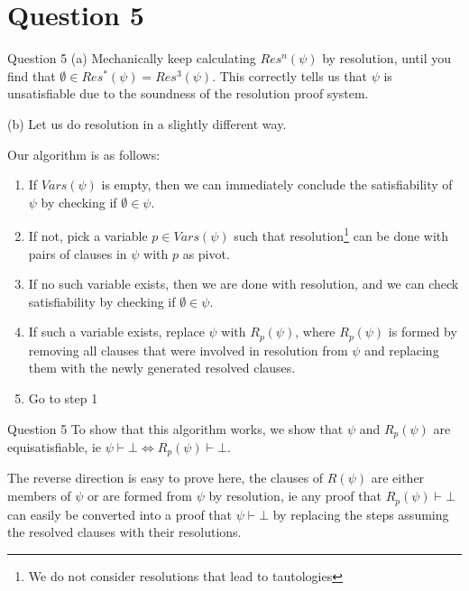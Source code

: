 \documentclass{beamer}
\begin{document}
    \section{Question 5}
    {
        \begin{frame}{Question 5}
            (a) Mechanically keep calculating $Res^{n}(\psi)$ by resolution, until you find that $\emptyset \in Res^{*}(\psi) = Res^{3}(\psi)$. This correctly tells us that $\psi$ is unsatisfiable due to the soundness of the resolution proof system.

            (b) Let us do resolution in a slightly different way. 
            
            Our algorithm is as follows:
            \begin{enumerate}
                \item If $Vars(\psi)$ is empty, then we can immediately conclude the satisfiability of $\psi$ by checking if $\emptyset \in \psi$.
                \item If not, pick a variable $p \in Vars(\psi)$ such that resolution\footnote{We do not consider resolutions that lead to tautologies} can be done with pairs of clauses in $\psi$ with $p$ as pivot. 
                \item If no such variable exists, then we are done with resolution, and we can check satisfiability by checking if $\emptyset \in \psi$.
                \item If such a variable exists, replace $\psi$ with $R_{p}(\psi)$, where $R_{p}(\psi)$ is formed by removing all clauses that were involved in resolution from $\psi$ and replacing them with the newly generated resolved clauses.
                \item Go to step 1
            \end{enumerate}

        \end{frame}
        \begin{frame}{Question 5}
            \vspace{-5pt}
            To show that this algorithm works, we show that $\psi$ and $R_{p}(\psi)$ are equisatisfiable, ie $\psi \vdash \bot \iff R_{p}(\psi) \vdash \bot$.

            The reverse direction is easy to prove here, the clauses of $R(\psi)$ are either members of $\psi$ or are formed from $\psi$ by resolution, ie any proof that $R_{p}(\psi) \vdash \bot$ can easily be converted into a proof that $\psi \vdash \bot$ by replacing the steps assuming the resolved clauses with their resolutions.


\end{frame}}
\end{document}
